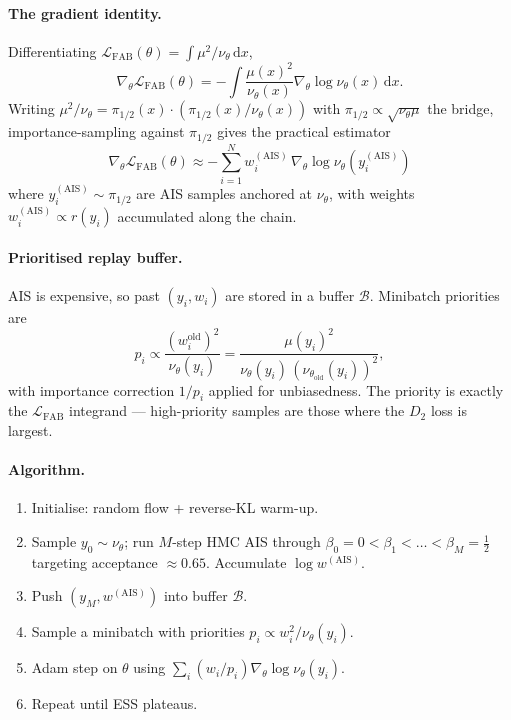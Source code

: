 \documentclass[11pt,letterpaper]{article}
\newcommand{\dd}{\mathrm{d}}
\theoremstyle{plain}
\begin{document}
\paragraph{The gradient identity.} Differentiating $\mathcal L_{\mathrm{FAB}}(\theta)=\int\mu^2/\nu_\theta\,\dd x$,
\[
  \nabla_\theta\mathcal L_{\mathrm{FAB}}(\theta) = -\int\frac{\mu(x)^2}{\nu_\theta(x)}\nabla_\theta\log\nu_\theta(x)\,\dd x.
\]
Writing $\mu^2/\nu_\theta = \pi_{1/2}(x)\cdot(\pi_{1/2}(x)/\nu_\theta(x))$ with $\pi_{1/2}\propto\sqrt{\nu_\theta\mu}$ the bridge, importance-sampling against $\pi_{1/2}$ gives the practical estimator
\[
  \boxed{\;\nabla_\theta\mathcal L_{\mathrm{FAB}}(\theta) \approx -\sum_{i=1}^N w_i^{(\mathrm{AIS})}\,\nabla_\theta\log\nu_\theta(y_i^{(\mathrm{AIS})})\;}
\]
where $y_i^{(\mathrm{AIS})}\sim\pi_{1/2}$ are AIS samples anchored at $\nu_\theta$, with weights $w_i^{(\mathrm{AIS})}\propto r(y_i)$ accumulated along the chain.

\paragraph{Prioritised replay buffer.} AIS is expensive, so past $(y_i,w_i)$ are stored in a buffer $\mathcal B$. Minibatch priorities are
\[
  p_i \propto \frac{(w_i^{\mathrm{old}})^2}{\nu_\theta(y_i)} = \frac{\mu(y_i)^2}{\nu_\theta(y_i)\,(\nu_{\theta_{\mathrm{old}}}(y_i))^2},
\]
with importance correction $1/p_i$ applied for unbiasedness. The priority is exactly the $\mathcal L_{\mathrm{FAB}}$ integrand --- high-priority samples are those where the $D_2$ loss is largest.

\paragraph{Algorithm.}
\begin{enumerate}\setlength{\itemsep}{2pt}
  \item Initialise: random flow + reverse-KL warm-up.
  \item Sample $y_0\sim\nu_\theta$; run $M$-step HMC AIS through $\beta_0=0<\beta_1<\dots<\beta_M=\tfrac{1}{2}$ targeting acceptance $\approx 0.65$. Accumulate $\log w^{(\mathrm{AIS})}$.
  \item Push $(y_M, w^{(\mathrm{AIS})})$ into buffer $\mathcal B$.
  \item Sample a minibatch with priorities $p_i\propto w_i^2/\nu_\theta(y_i)$.
  \item Adam step on $\theta$ using $\sum_i(w_i/p_i)\nabla_\theta\log\nu_\theta(y_i)$.
  \item Repeat until ESS plateaus.
\end{enumerate}
\end{document}

